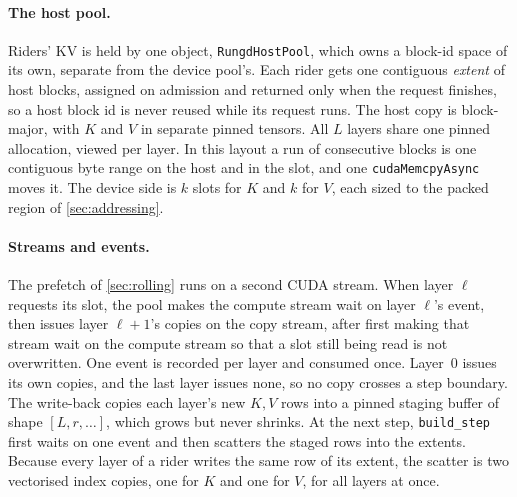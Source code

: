 \paragraph{The host pool.} Riders' KV is held by one object,
\texttt{RungdHostPool}, which owns a block-id space of its own, separate from
the device pool's. Each rider gets one contiguous \emph{extent} of host blocks,
assigned on admission and returned only when the request finishes, so a host
block id is never reused while its request runs. The host copy is block-major,
with $K$ and $V$ in separate pinned tensors. All $L$ layers share one pinned
allocation, viewed per layer. In this layout a run of consecutive blocks is
one contiguous byte range on the host and in the slot, and one
\texttt{cudaMemcpyAsync} moves it. The device side is $k$ slots for $K$ and
$k$ for $V$, each sized to the packed region of \cref{sec:addressing}.

\paragraph{Streams and events.} The prefetch of \cref{sec:rolling} runs on a
second CUDA stream. When layer $\ell$ requests its slot, the pool makes the
compute stream wait on layer $\ell$'s event, then issues layer $\ell{+}1$'s
copies on the copy stream, after first making that stream wait on the compute
stream so that a slot still being read is not overwritten. One event is
recorded per layer and consumed once. Layer~0 issues its own copies, and the
last layer issues none, so no copy crosses a step boundary. The write-back
copies each layer's new $K,V$ rows into a pinned staging buffer of shape
$[L, r, \dots]$, which grows but never shrinks. At the next step,
\texttt{build\_step} first waits on one event and then scatters the staged rows
into the extents. Because every layer of a rider writes the same row of its
extent, the scatter is two vectorised index copies, one for $K$ and one for
$V$, for all layers at once.

